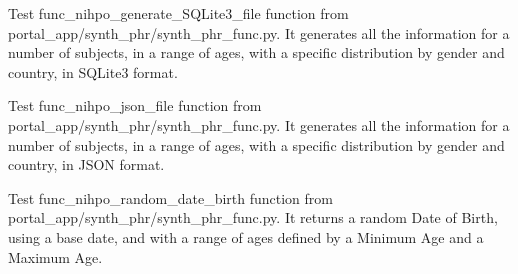 \documentclass[letterpaper,10pt,english]{sphinxmanual}
\begin{document}
\begin{fulllineitems}
\begin{fulllineitems}
\end{fulllineitems}


\begin{fulllineitems}
\label{\detokenize{CE_app.tests:CE_app.tests.test_phr.PHRTestCase.test_func_nihpo_generate_SQLite3_file}}
\sphinxAtStartPar
Test func\_nihpo\_generate\_SQLite3\_file function from portal\_app/synth\_phr/synth\_phr\_func.py.
It generates all the information for a number of subjects, in a range of ages,
with a specific distribution by gender and country, in SQLite3 format.

\end{fulllineitems}


\begin{fulllineitems}
\label{\detokenize{CE_app.tests:CE_app.tests.test_phr.PHRTestCase.test_func_nihpo_json_file}}
\sphinxAtStartPar
Test func\_nihpo\_json\_file function from portal\_app/synth\_phr/synth\_phr\_func.py.
It generates all the information for a number of subjects, in a range of ages,
with a specific distribution by gender and country, in JSON format.

\end{fulllineitems}


\begin{fulllineitems}
\label{\detokenize{CE_app.tests:CE_app.tests.test_phr.PHRTestCase.test_func_nihpo_random_date_birth}}
\sphinxAtStartPar
Test func\_nihpo\_random\_date\_birth function from portal\_app/synth\_phr/synth\_phr\_func.py.
It returns a random Date of Birth, using a base date, and with a range of ages defined by
a Minimum Age and a Maximum Age.


\end{fulllineitems}
\end{fulllineitems}
\end{document}
